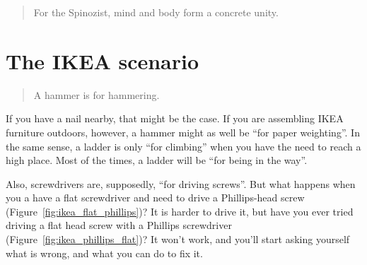 \documentclass{article}
\begin{document}
\begin{quotation}
  For the Spinozist, mind and body form a concrete unity.
\end{quotation}


\section{The IKEA scenario}

\begin{quotation}
  A hammer is for hammering.
\end{quotation}

If you have a nail nearby, that might be the case. If you are assembling IKEA
furniture outdoors, however, a hammer might as well be ``for paper weighting''.
In the same sense, a ladder is only ``for climbing'' when you have the need to
reach a high place. Most of the times, a ladder will be
``for being in the way''.

Also, screwdrivers are, supposedly, ``for driving screws''. But what happens
when you a have a flat screwdriver and need to drive a Phillips-head screw
(Figure~\ref{fig:ikea_flat_phillips})? It is harder to drive it, but have you
ever tried driving a flat head screw with a Phillips screwdriver
(Figure~\ref{fig:ikea_phillips_flat})? It won't work, and you'll start asking
yourself what is wrong, and what you can do to fix it.
\end{document}
